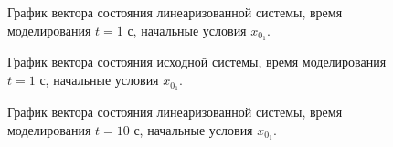 \begin{figure}[!h]
\caption{График вектора состояния линеаризованной системы, время моделирования $t=1$ с, начальные условия $x_{0_1}$.}
\label{2_x_lin_01_sm}
\end{figure}

\begin{figure}[!h]
\caption{График вектора состояния исходной системы, время моделирования $t=1$ с, начальные условия $x_{0_1}$.}
\label{2_x_nlin_01_sm}
\end{figure}

\begin{figure}[!h]
\caption{График вектора состояния линеаризованной системы, время моделирования $t=10$ с, начальные условия $x_{0_1}$.}
\label{2_x_lin_01_lg}
\end{figure}

